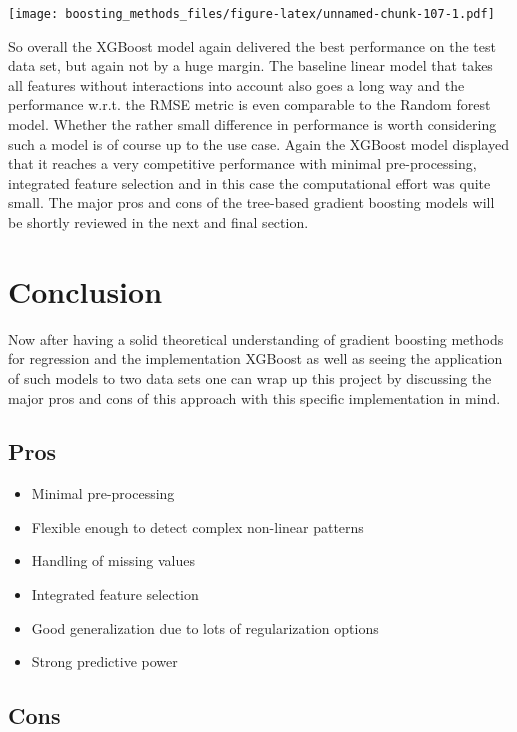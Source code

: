 \documentclass[
]{book}
\begin{document}
\texttt{[image: boosting\_methods\_files/figure-latex/unnamed-chunk-107-1.pdf]}

So overall the XGBoost model again delivered the best performance on the test data set, but again not by a huge margin. The baseline linear model that takes all features without interactions into account also goes a long way and the performance w.r.t. the RMSE metric is even comparable to the Random forest model. Whether the rather small difference in performance is worth considering such a model is of course up to the use case. Again the XGBoost model displayed that it reaches a very competitive performance with minimal pre-processing, integrated feature selection and in this case the computational effort was quite small. The major pros and cons of the tree-based gradient boosting models will be shortly reviewed in the next and final section.

\hypertarget{conclusion}{%
\chapter{Conclusion}\label{conclusion}}

Now after having a solid theoretical understanding of gradient boosting methods for regression and the implementation XGBoost as well as seeing the application of such models to two data sets one can wrap up this project by discussing the major pros and cons of this approach with this specific implementation in mind.

\hypertarget{pros}{%
\section{Pros}\label{pros}}

\begin{itemize}
\item
  Minimal pre-processing
\item
  Flexible enough to detect complex non-linear patterns
\item
  Handling of missing values
\item
  Integrated feature selection
\item
  Good generalization due to lots of regularization options
\item
  Strong predictive power
\end{itemize}

\hypertarget{cons}{%
\section{Cons}\label{cons}}
\end{document}
